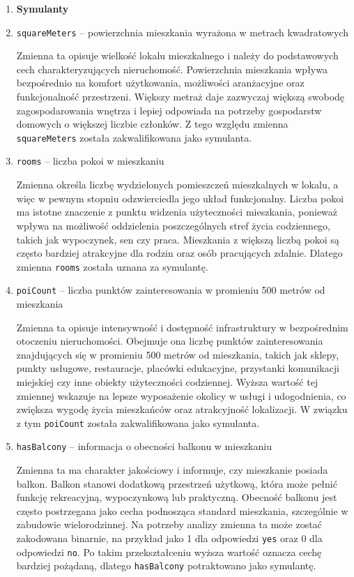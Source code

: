\documentclass{report}
\begin{document}
\begin{enumerate}[leftmargin=*, label=\arabic*.]
    \item[] \textbf{Symulanty}

    \item \texttt{squareMeters} -- powierzchnia mieszkania wyrażona w metrach kwadratowych

    Zmienna ta opisuje wielkość lokalu mieszkalnego i należy do podstawowych cech charakteryzujących nieruchomość. Powierzchnia mieszkania wpływa bezpośrednio na komfort użytkowania, możliwości aranżacyjne oraz funkcjonalność przestrzeni. Większy metraż daje zazwyczaj większą swobodę zagospodarowania wnętrza i lepiej odpowiada na potrzeby gospodarstw domowych o większej liczbie członków. Z tego względu zmienna \texttt{squareMeters} została zakwalifikowana jako symulanta.

    \item \texttt{rooms} -- liczba pokoi w mieszkaniu

    Zmienna określa liczbę wydzielonych pomieszczeń mieszkalnych w lokalu, a więc w pewnym stopniu odzwierciedla jego układ funkcjonalny. Liczba pokoi ma istotne znaczenie z punktu widzenia użyteczności mieszkania, ponieważ wpływa na możliwość oddzielenia poszczególnych stref życia codziennego, takich jak wypoczynek, sen czy praca. Mieszkania z większą liczbą pokoi są często bardziej atrakcyjne dla rodzin oraz osób pracujących zdalnie. Dlatego zmienna \texttt{rooms} została uznana za symulantę.

    \item \texttt{poiCount} -- liczba punktów zainteresowania w promieniu 500 metrów od mieszkania

    Zmienna ta opisuje intensywność i dostępność infrastruktury w bezpośrednim otoczeniu nieruchomości. Obejmuje ona liczbę punktów zainteresowania znajdujących się w promieniu 500 metrów od mieszkania, takich jak sklepy, punkty usługowe, restauracje, placówki edukacyjne, przystanki komunikacji miejskiej czy inne obiekty użyteczności codziennej. Wyższa wartość tej zmiennej wskazuje na lepsze wyposażenie okolicy w usługi i udogodnienia, co zwiększa wygodę życia mieszkańców oraz atrakcyjność lokalizacji. W związku z tym \texttt{poiCount} została zakwalifikowana jako symulanta.

    \item \texttt{hasBalcony} -- informacja o obecności balkonu w mieszkaniu

    Zmienna ta ma charakter jakościowy i informuje, czy mieszkanie posiada balkon. Balkon stanowi dodatkową przestrzeń użytkową, która może pełnić funkcję rekreacyjną, wypoczynkową lub praktyczną. Obecność balkonu jest często postrzegana jako cecha podnosząca standard mieszkania, szczególnie w zabudowie wielorodzinnej. Na potrzeby analizy zmienna ta może zostać zakodowana binarnie, na przykład jako 1 dla odpowiedzi \texttt{yes} oraz 0 dla odpowiedzi \texttt{no}. Po takim przekształceniu wyższa wartość oznacza cechę bardziej pożądaną, dlatego \texttt{hasBalcony} potraktowano jako symulantę.


\end{enumerate}
\end{document}
